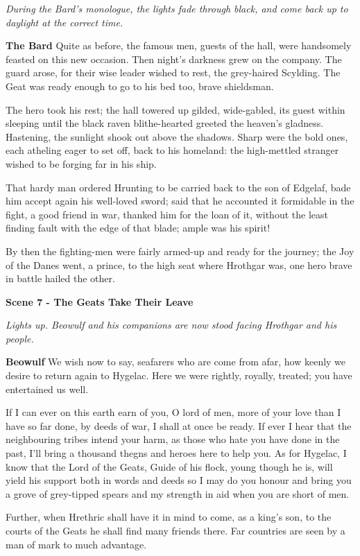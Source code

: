 \documentclass[a4paper]{article}
\begin{document}
{\centerline{\textit{During the Bard's monologue, the lights fade through black, and come back up to daylight at the correct time.}}

\textbf{The Bard} Quite as before, the famous men,
guests of the hall, were handsomely feasted
on this new occasion. Then night’s darkness
grew on the company. The guard arose,
for their wise leader wished to rest,
the grey-haired Scylding. The Geat was ready enough
to go to his bed too, brave shieldsman.

The hero took his rest; the hall towered up
gilded, wide-gabled, its guest within sleeping
until the black raven blithe-hearted greeted
the heaven’s gladness. Hastening, the sunlight
shook out above the shadows. Sharp were the bold ones,
each atheling eager to set off,
back to his homeland: the high-mettled stranger
wished to be forging far in his ship.

That hardy man ordered Hrunting to be carried
back to the son of Edgelaf, bade him accept again
his well-loved sword; said that he accounted it
formidable in the fight, a good friend in war,
thanked him for the loan of it, without the least finding fault
with the edge of that blade; ample was his spirit!

By then the fighting-men were fairly armed-up
and ready for the journey; the Joy of the Danes went,
a prince, to the high seat where Hrothgar was,
one hero brave in battle hailed the other.

\centerline{\textbf{Scene 7 - The Geats Take Their Leave}}
\centerline{\textit{Lights up. Beowulf and his companions are now stood facing Hrothgar and his people.}}

\textbf{Beowulf} We wish now to say, seafarers who
are come from afar, how keenly we desire
to return again to Hygelac. Here we were rightly,
royally, treated; you have entertained us well.

If I can ever on this earth earn of you,
O lord of men, more of your love
than I have so far done, by deeds of war,
I shall at once be ready. If ever I hear
that the neighbouring tribes intend your harm,
as those who hate you have done in the past,
I’ll bring a thousand thegns and heroes
here to help you. As for Hygelac, I know
that the Lord of the Geats, Guide of his flock,
young though he is, will yield his support
both in words and deeds so I may do you honour
and bring you a grove of grey-tipped spears
and my strength in aid when you are short of men.

Further, when Hrethric shall have it in mind
to come, as a king’s son, to the courts of the Geats
he shall find many friends there. Far countries are seen
by a man of mark to much advantage.

}
\end{document}
